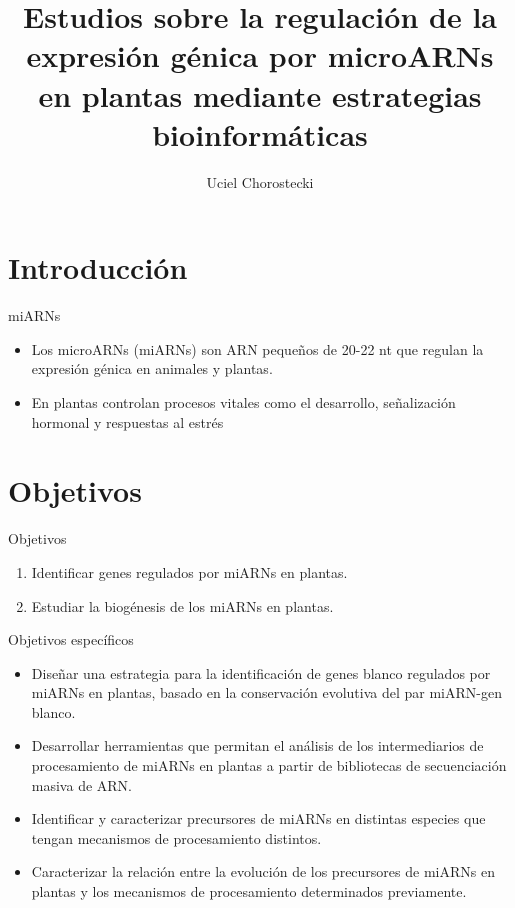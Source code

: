 \documentclass{beamer}
\title[]{Estudios sobre la regulación de la expresión génica por microARNs en plantas mediante estrategias bioinformáticas}
\author{Uciel Chorostecki}
\institute[IBR]{ \\Director Dr. Javier Palatnik\\Instituto Biología Molecular y Celular Rosario}
\date{}
\begin{document}
\frame{\titlepage}

\section{Introducción}

\begin{frame}{miARNs}
    \begin{itemize}
        \item Los microARNs (miARNs) son ARN pequeños de 20-22 nt que regulan la expresión génica en animales y plantas. 
        \item En plantas controlan procesos vitales como el desarrollo, señalización hormonal y respuestas al estrés
    \end{itemize}
\end{frame}

\section{Objetivos}

\begin{frame}{Objetivos}
    \pause
	\begin{enumerate}
        \item<1-> Identificar genes regulados por miARNs en plantas.
        \item<-1> Estudiar la biogénesis de los miARNs en plantas.
	\end{enumerate}
\end{frame}

\begin{frame}{Objetivos específicos}
		\pause
		\begin{itemize}
            \item<-2> Diseñar una estrategia para la identificación de genes blanco regulados por miARNs en plantas, basado en la conservación evolutiva del par miARN-gen blanco.
			\item<-1> Desarrollar herramientas que permitan el análisis de los intermediarios de procesamiento de miARNs en plantas a partir de bibliotecas de secuenciación masiva de ARN.
			\item<-1> Identificar y caracterizar precursores de miARNs en distintas especies que tengan mecanismos de procesamiento distintos.
			\item<-1> Caracterizar la relación entre la evolución de los precursores de miARNs en plantas y los mecanismos de procesamiento determinados previamente.
        \end{itemize}
\end{frame}
\end{document}
